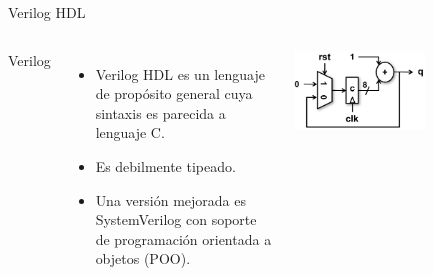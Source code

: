 \begin{frame}{Verilog HDL}
\begin{columns}
	
\begin{block}{Verilog}
			
\end{block}
	\begin{itemize}
	\item Verilog HDL es un lenguaje de propósito general cuya sintaxis es parecida a lenguaje C.
    \item Es debilmente tipeado.
    \item Una versión mejorada es SystemVerilog con soporte de programación orientada a objetos (POO).
		\end{itemize}  
        \begin{center}
        \includegraphics[width=0.6\textwidth]{Figs/Registro_8Bits}
        \end{center}	
	
\end{columns}
\end{frame}

